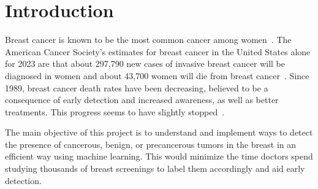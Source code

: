 \chapter{Introduction}

\label{intro}

\par Breast cancer is known to be the most common cancer among women~\cite{link1}. The American Cancer Society’s estimates for breast cancer in the United States alone for 2023 are that about 297,790 new cases of invasive breast cancer will be diagnosed in women and about 43,700 women will die from breast cancer~\cite{link2}. Since 1989, breast cancer death rates have been decreasing, believed to be a consequence of early detection and increased awareness, as well as better treatments. This progress seems to have slightly stopped~\cite{link2}.

The main objective of this project is to understand and implement ways to detect the presence of cancerous, benign, or precancerous tumors in the breast in an efficient way using machine learning. This would minimize the time doctors spend studying thousands of breast screenings to label them accordingly and aid early detection.